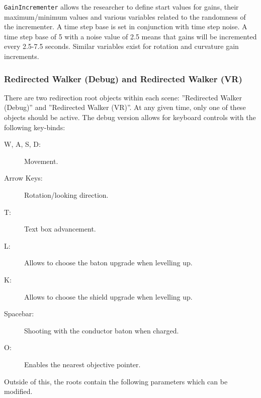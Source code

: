 \lstinline{GainIncrementer} allows the researcher to define start values for gains, their maximum/minimum values and various variables related to the randomness of the incrementer. A time step base is set in conjunction with time step noise. A time step base of 5 with a noise value of 2.5 means that gains will be incremented every 2.5-7.5 seconds. Similar variables exist for rotation and curvature gain increments.

\subsubsection{Redirected Walker (Debug) and Redirected Walker (VR)}
There are two redirection root objects within each scene: ''Redirected Walker (Debug)'' and ''Redirected Walker (VR)''. At any given time, only one of these objects should be active. The debug version allows for keyboard controls with the following key-binds:

\begin{description}
   \item[W, A, S, D:] Movement.
   \item[Arrow Keys:] Rotation/looking direction.
   \item[T:] Text box advancement.
   \item[L:] Allows to choose the baton upgrade when levelling up.
   \item[K:] Allows to choose the shield upgrade when levelling up.
   \item[Spacebar:] Shooting with the conductor baton when charged. 
   \item[O:] Enables the nearest objective pointer. 
\end{description}

Outside of this, the roots contain the following parameters which can be modified.

